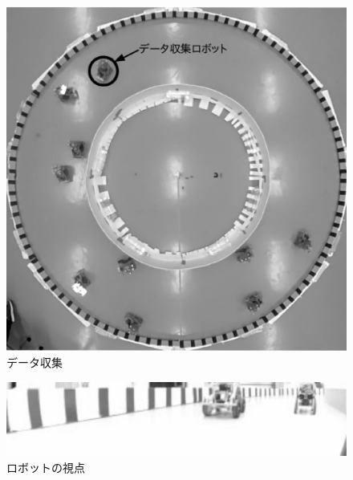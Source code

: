 \vspace{-2mm}
\begin{figure}[h]
        \centering
        \includegraphics[width=0.8\linewidth]{teacher_collection.eps}
        \caption{データ収集}
        \label{data_colle}
\end{figure}

\vspace{-5mm}
\begin{figure}[h]
\centering
\includegraphics[width=0.7\linewidth]{robot_eye.eps}
\caption{ロボットの視点}
\label{roboteye}
\end{figure}



